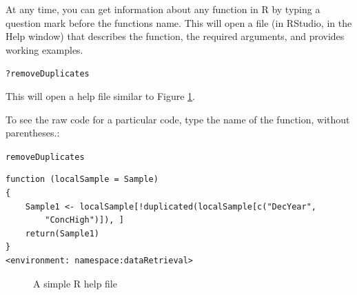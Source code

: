 \documentclass[a4paper,11pt]{article}\usepackage[]{graphicx}\usepackage[]{color}
\makeatletter
\newcommand{\hlopt}[1]{\textcolor[rgb]{0,0,0}{#1}}%
\newcommand{\hlstd}[1]{\textcolor[rgb]{0.345,0.345,0.345}{#1}}%
\newenvironment{kframe}{%
 \def\at@end@of@kframe{}%
 \ifinner\ifhmode%
  \def\at@end@of@kframe{\end{minipage}}%
  \begin{minipage}{\columnwidth}%
 \fi\fi%
 \def\FrameCommand##1{\hskip\@totalleftmargin \hskip-\fboxsep
 \colorbox{shadecolor}{##1}\hskip-\fboxsep
     \hskip-\linewidth \hskip-\@totalleftmargin \hskip\columnwidth}%
 \MakeFramed {\advance\hsize-\width
   \@totalleftmargin\z@ \linewidth\hsize
   \@setminipage}}%
 {\par\unskip\endMakeFramed%
 \at@end@of@kframe}
\newenvironment{knitrout}{}{} %
\makeatother
\begin{document}
At any time, you can get information about any function in R by typing a question mark before the functions name.  This will open a file (in RStudio, in the Help window) that describes the function, the required arguments, and provides working examples.

\begin{knitrout}
\color{fgcolor}\begin{kframe}
\begin{alltt}
\hlopt{?}\hlstd{removeDuplicates}
\end{alltt}
\end{kframe}
\end{knitrout}

This will open a help file similar to Figure \ref{fig:help}.

\FloatBarrier

To see the raw code for a particular code, type the name of the function, without parentheses.:
\begin{knitrout}
\color{fgcolor}\begin{kframe}
\begin{alltt}
\hlstd{removeDuplicates}
\end{alltt}
\begin{verbatim}
function (localSample = Sample) 
{
    Sample1 <- localSample[!duplicated(localSample[c("DecYear", 
        "ConcHigh")]), ]
    return(Sample1)
}
<environment: namespace:dataRetrieval>
\end{verbatim}
\end{kframe}
\end{knitrout}


\begin{figure}[ht!]
\centering
\caption{A simple R help file}
\label{fig:help}
\end{figure}
\end{document}
